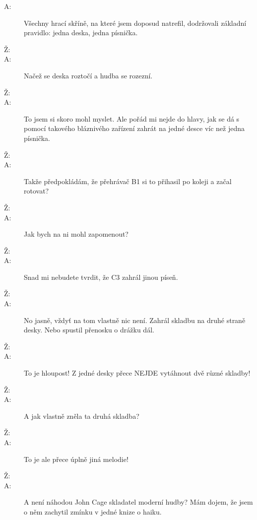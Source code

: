 \documentclass[12pt]{article}
\begin{document}
\begin{description}
\item[A:] Všechny hrací skříně, na které jsem doposud natrefil, dodržovali základní
    pravidlo: jedna deska, jedna písnička.

\item[Ž:]

\item[A:] Načež se deska roztočí a hudba se rozezní.

\item[Ž:]

\item[A:] To jsem si skoro mohl myslet. Ale pořád mi nejde do hlavy, jak
    se dá s pomocí takového bláznivého zařízení zahrát na jedné desce víc než
    jedna písnička.

\item[Ž:]

\item[A:] Takže předpokládám, že přehrávač B1 si to přihasil po koleji
    a začal rotovat?

\item[Ž:]

\item[A:] Jak bych na ni mohl zapomenout?

\item[Ž:]

\item[A:] Snad mi nebudete tvrdit, že C3 zahrál jinou píseň.

\item[Ž:]

\item[A:] No jasně, vždyť na tom vlastně nic není. Zahrál skladbu na druhé straně desky.
    Nebo spustil přenosku o drážku dál.

\item[Ž:]

\item[A:] To je hloupost! Z jedné desky přece NEJDE vytáhnout dvě různé skladby!

\item[Ž:]

\item[A:] A jak vlastně zněla ta druhá skladba?

\item[Ž:]

\item[A:] To je ale přece úplně jiná melodie!

\item[Ž:]

\item[A:] A není náhodou John Cage skladatel moderní hudby? Mám dojem, že jsem o něm
    zachytil zmínku v jedné knize o haiku.


\end{description}
\end{document}
